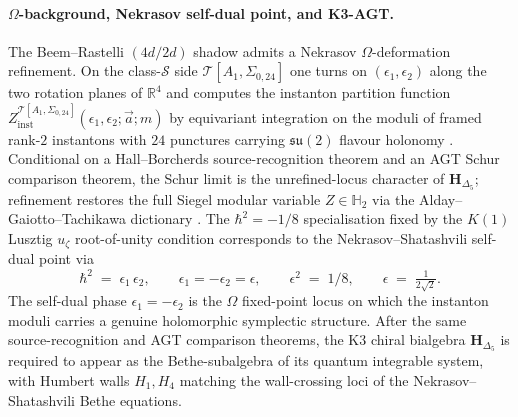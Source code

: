 \paragraph{$\Omega$-background, Nekrasov self-dual point, and
K3-AGT.}
The Beem--Rastelli $(4d/2d)$ shadow admits a Nekrasov
$\Omega$-deformation refinement. On the class-$\mathcal{S}$ side
$\mathcal{T}[A_1,\Sigma_{0,24}]$ one turns on
$(\epsilon_1,\epsilon_2)$ along the two rotation planes of
$\mathbb{R}^4$ and computes the instanton partition function
$Z^{\mathcal{T}[A_1,\Sigma_{0,24}]}_{\mathrm{inst}}(\epsilon_1,\epsilon_2;
\vec a;m)$ by equivariant integration on the moduli of framed
rank-$2$ instantons with $24$ punctures carrying $\mathfrak{su}(2)$
flavour holonomy \cite{Nekrasov2003,NekrasovOkounkov2006}.
Conditional on a Hall--Borcherds source-recognition theorem and an
AGT Schur comparison theorem, the Schur limit is the
unrefined-locus character of
$\mathbf{H}_{\Delta_5}$; refinement restores the full Siegel
modular variable $Z \in \mathbb{H}_2$ via the
Alday--Gaiotto--Tachikawa dictionary \cite{AGT09,AldayTachikawa10}.
The $\hbar^2 = -1/8$ specialisation fixed by the $K(1)$ Lusztig
$u_\zeta$ root-of-unity condition
corresponds to the Nekrasov--Shatashvili self-dual point
\cite{NekrasovShatashvili2009} via
\[
 \hbar^2 \;=\; \epsilon_1\,\epsilon_2,
 \qquad
 \epsilon_1 = -\epsilon_2 = \epsilon,
 \qquad
 \epsilon^2 \;=\; 1/8,
 \qquad
 \epsilon \;=\; \tfrac{1}{2\sqrt{2}}.
\]
The self-dual phase $\epsilon_1 = -\epsilon_2$ is the $\Omega$
fixed-point locus on which the instanton moduli carries a genuine
holomorphic symplectic structure. After the same source-recognition
and AGT comparison theorems, the K3 chiral bialgebra
$\mathbf{H}_{\Delta_5}$ is required to appear as the Bethe-subalgebra
of its quantum integrable system, with Humbert walls $H_1, H_4$
matching the wall-crossing loci of the Nekrasov--Shatashvili Bethe
equations.


